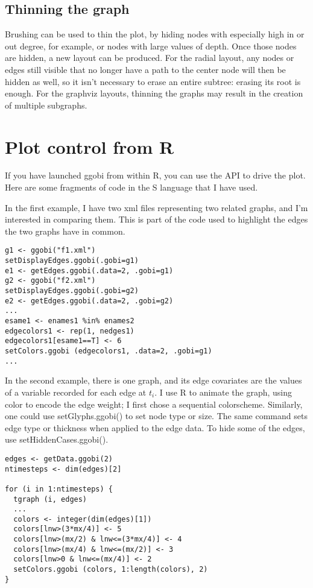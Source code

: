 \documentclass[11pt]{article}
\begin{document}
\subsection{Thinning the graph}

Brushing can be used to thin the plot, by hiding nodes with especially
high in or out degree, for example, or nodes with large values of depth.
Once those nodes are hidden, a new layout can be produced.
For the radial layout, any nodes or edges still visible that no longer
have a path to the center node will then be hidden as well, so it isn't
necessary to erase an entire subtree: erasing its root is enough.
For the graphviz layouts, thinning the graphs may result in the
creation of multiple subgraphs.

\section{Plot control from R}

If you have launched ggobi from within R, you can use the API to
drive the plot.  Here are some fragments of code in the S language
that I have used.

In the first example, I have two xml files representing two
related graphs, and I'm interested in comparing them.  This is
part of the code used to highlight the edges the two graphs
have in common.

\begin{verbatim}
g1 <- ggobi("f1.xml")
setDisplayEdges.ggobi(.gobi=g1)
e1 <- getEdges.ggobi(.data=2, .gobi=g1)
g2 <- ggobi("f2.xml")
setDisplayEdges.ggobi(.gobi=g2)
e2 <- getEdges.ggobi(.data=2, .gobi=g2)
...
esame1 <- enames1 %in% enames2
edgecolors1 <- rep(1, nedges1)
edgecolors1[esame1==T] <- 6
setColors.ggobi (edgecolors1, .data=2, .gobi=g1)
...
\end{verbatim}


In the second example, there is one graph, and its edge covariates are
the values of a variable recorded for each edge at $t_i$.  I use R to
animate the graph, using color to encode the edge weight; I first chose
a sequential colorscheme.  Similarly, one could use setGlyphs.ggobi() to
set node type or size.  The same command sets edge type or thickness
when applied to the edge data.  To hide some of the edges, use
setHiddenCases.ggobi().

\begin{verbatim}
edges <- getData.ggobi(2)
ntimesteps <- dim(edges)[2]

for (i in 1:ntimesteps) {
  tgraph (i, edges)
  ...
  colors <- integer(dim(edges)[1])
  colors[lnw>(3*mx/4)] <- 5
  colors[lnw>(mx/2) & lnw<=(3*mx/4)] <- 4
  colors[lnw>(mx/4) & lnw<=(mx/2)] <- 3
  colors[lnw>0 & lnw<=(mx/4)] <- 2
  setColors.ggobi (colors, 1:length(colors), 2)
}
\end{verbatim}
\end{document}
